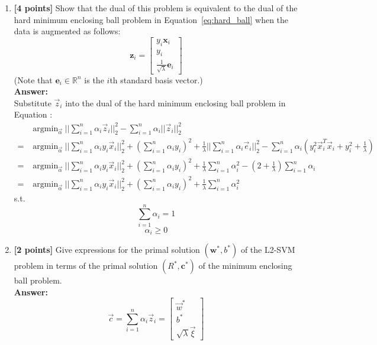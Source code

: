 \documentclass{article}
\DeclareMathOperator*{\argmin}{\mathrm{argmin}}
\begin{document}
\begin{enumerate}[resume]
	\item \textbf{[4 points]} Show that the dual of this problem is equivalent to the dual of the hard minimum enclosing ball problem in Equation~\ref{eq:hard_ball} when the data is augmented as follows:
	\[\boldsymbol{z}_{i}=\left[\begin{array}{c}
	y_{i}\boldsymbol{x}_{i}\\
	y_{i}\\
	\frac{1}{\sqrt{\lambda}}\boldsymbol{e}_{i}
	\end{array}\right]\]
	(Note that $\boldsymbol{e}_i\in\mathbb{R}^n$ is the $i$th standard basis vector.)\\
	\textbf{Answer:}\\
	Substitute $\vec{z}_i$ into the dual of the hard minimum enclosing ball problem in Equation \label{eq:hard_ball}:
	\begin{equation}
	\nonumber
	\begin{array}{rl}
	& \argmin_{\vec{\alpha}} ||\sum_{i=1}^n\alpha_i\vec{z}_i||_2^2 - \sum_{i=1}^n \alpha_i||\vec{z}_i||_2^2  \\
	= & \argmin_{\vec{\alpha}} ||\sum_{i=1}^n\alpha_iy_i\vec{x}_i||_2^2 + (\sum_{i=1}^n\alpha_iy_i)^2 + \frac{1}{\lambda}||\sum_{i=1}^n\alpha_i\vec{e}_i||_2^2 - \sum_{i=1}^n \alpha_i(y_i^2\vec{x}_i^T\vec{x}_i+y_i^2+\frac{1}{\lambda}) \\
	= & \argmin_{\vec{\alpha}} ||\sum_{i=1}^n\alpha_iy_i\vec{x}_i||_2^2 + (\sum_{i=1}^n\alpha_iy_i)^2 + \frac{1}{\lambda}\sum_{i=1}^{n}\alpha_i^2 - (2+\frac{1}{\lambda})\sum_{i=1}^n \alpha_i \\
	= & \argmin_{\vec{\alpha}} ||\sum_{i=1}^n\alpha_iy_i\vec{x}_i||_2^2 + (\sum_{i=1}^n\alpha_iy_i)^2 + \frac{1}{\lambda}\sum_{i=1}^{n}\alpha_i^2
	\end{array}
	\end{equation}
	s.t.
	$$\sum_{i=1}^{n}\alpha_i=1$$
	$$\alpha_i \geq 0$$


	\item \textbf{[2 points]} Give expressions for the primal solution $\left( \boldsymbol{w}^{*}, b^{*} \right)$ of the L2-SVM problem in terms of the primal solution $\left( R^{*}, \boldsymbol{c}^{*} \right)$ of the minimum enclosing ball problem.\\
	\textbf{Answer:}\\
	\begin{equation}
	\nonumber
	\vec{c}=\sum_{i=1}^{n}\alpha_i \vec{z}_i=\left[
	\begin{array}{c}
	\vec{w}^* \\
	b^* \\
	\sqrt{\lambda}\vec{\xi}
	\end{array}\right]
	\end{equation}
		
\end{enumerate}
\end{document}

